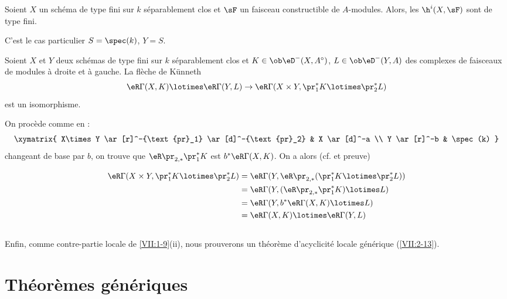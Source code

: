 \begin{corollary_}\label{VII:1-10}
Soient $X$ un schéma de type fini sur $k$ séparablement clos et $\sF$ un 
faisceau constructible de $A$-modules. Alors, les $\h^i(X,\sF)$ sont de type 
fini. 
\end{corollary_}

C'est le cas particulier $S=\spec(k)$, $Y=S$. 

\begin{corollary_}\label{VII:1-11}
Soient $X$ et $Y$ deux schémas de type fini sur $k$ séparablement clos et 
$K\in \ob\eD^-(X,A^\circ)$, $L\in \ob\eD^-(Y,A)$ des complexes de faisceaux de 
modules à droite et à gauche. La flèche de K\"unneth 
\[
  \eR \Gamma(X,K) \lotimes \eR \Gamma(Y,L) \to \eR\Gamma(X\times Y,\pr_1^\ast K \lotimes \pr_2^\ast L) 
\]
est un isomorphisme. 
\end{corollary_}

On procède comme en \cite[XVII 5.4.3]{sga4}: 
\[\xymatrix{
  X\times Y \ar[r]^-{\text{pr}_1} \ar[d]^-{\text{pr}_2} 
    & X \ar[d]^-a \\
  Y \ar[r]^-b 
    & \spec(k) 
}\]
changeant de base par $b$, on trouve que 
$\eR\pr_{2,\ast}{} \pr_1^\ast K$ est 
$b^\ast \eR\Gamma(X,K)$. On a alors (cf. \cite[XVII 5.2.11]{sga4} et preuve) 

\begin{align*}
  \eR\Gamma(X\times Y,\pr_1^\ast K\lotimes \pr_2^\ast L) 
    &= \eR\Gamma(Y,\eR \pr_{2,\ast}(\pr_1^\ast K\lotimes \pr_2^\ast L)) \\
    &= \eR\Gamma(Y,(\eR\pr_{2,\ast}\pr_1^\ast K)\lotimes L) \\
    &= \eR\Gamma(Y,b^\ast \eR\Gamma(X,K)\lotimes L) \\
    &= \eR\Gamma(X,K)\lotimes \eR\Gamma(Y,L) 
\end{align*}





\subsection{}\label{VII:1-12}

Enfin, comme contre-partie locale de \ref{VII:1-9}(ii), nous prouverons un 
théorème d'acyclicité locale générique (\ref{VII:2-13}). 










\section{Théorèmes génériques}\label{VII:2}

